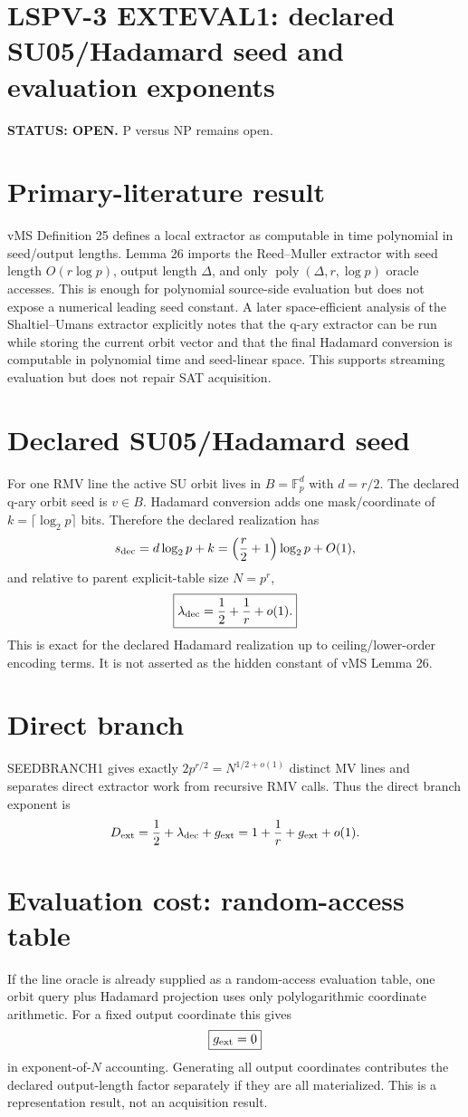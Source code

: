 \documentclass[11pt]{article}
\begin{document}
\section*{LSPV-3 EXTEVAL1: declared SU05/Hadamard seed and evaluation exponents}
\textbf{STATUS: OPEN.} P versus NP remains open.
\section*{Primary-literature result}
vMS Definition 25 defines a local extractor as computable in time polynomial in seed/output lengths. Lemma 26 imports the Reed--Muller extractor with seed length $O(r\log p)$, output length $\Delta$, and only $\operatorname{poly}(\Delta,r,\log p)$ oracle accesses. This is enough for polynomial source-side evaluation but does not expose a numerical leading seed constant.
A later space-efficient analysis of the Shaltiel--Umans extractor explicitly notes that the q-ary extractor can be run while storing the current orbit vector and that the final Hadamard conversion is computable in polynomial time and seed-linear space. This supports streaming evaluation but does not repair SAT acquisition.
\section*{Declared SU05/Hadamard seed}
For one RMV line the active SU orbit lives in $B=\mathbb F_p^d$ with $d=r/2$. The declared q-ary orbit seed is $v\in B$. Hadamard conversion adds one mask/coordinate of $k=\lceil\log_2p\rceil$ bits. Therefore the declared realization has
\[
s_{\rm dec}=d\log_2p+k
=\left(\frac r2+1\right)\log_2p+O(1),
\]
and relative to parent explicit-table size $N=p^r$,
\[
\boxed{\lambda_{\rm dec}=\frac12+\frac1r+o(1).}
\]
This is exact for the declared Hadamard realization up to ceiling/lower-order encoding terms. It is not asserted as the hidden constant of vMS Lemma 26.
\section*{Direct branch}
SEEDBRANCH1 gives exactly $2p^{r/2}=N^{1/2+o(1)}$ distinct MV lines and separates direct extractor work from recursive RMV calls. Thus the direct branch exponent is
\[
D_{\rm ext}=\frac12+\lambda_{\rm dec}+g_{\rm ext}
=1+\frac1r+g_{\rm ext}+o(1).
\]
\section*{Evaluation cost: random-access table}
If the line oracle is already supplied as a random-access evaluation table, one orbit query plus Hadamard projection uses only polylogarithmic coordinate arithmetic. For a fixed output coordinate this gives
\[
\boxed{g_{\rm ext}=0}
\]
in exponent-of-$N$ accounting. Generating all output coordinates contributes the declared output-length factor separately if they are all materialized.
This is a representation result, not an acquisition result.
\end{document}
